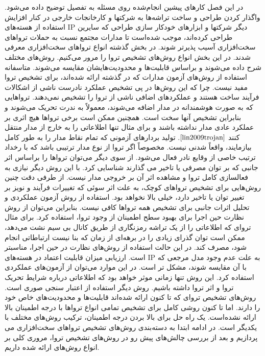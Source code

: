 

در این فصل کارهای پیشین انجام‌شده روی مسئله به تفصیل توضیح داده می‌شود.
واگذار کردن طراحی و ساخت تراشه‌ها به شرکتها و کارخانجات خارجی در کنار افزایش استفاده از هسته‌های IP دیگر شرکتها و ابزارهای خودکار سازی طراحی که سایرین طراحی کرده‌اند، موجب شده‌است تا مدارات مجتمع نسبت به حملات تروا‌های سخت‌افزاری آسیب پذیرتر شوند. در بخش گذشته انواع تروا‌های سخت‌افزاری معرفی شدند. در این بخش انواع روش‌های تشخیص تروا را مرور می‌کنیم. روش‌های مختلف شرح داده می‌شوند و براساس قابلیت‌ها و محدودیت‌هایشان مقایسه می‌شوند. متاسفانه استفاده از روش‌های آزمون مدارات که در گذشته ارائه شده‌اند، برای تشخیص تروا مفید نیست. چرا که این روش‌ها در پی تشخیص عملکرد نادرست ناشی از اشکالات فرآیند ساخت هستند و عملکردهای اضافی ناشی از تروا را تشخیص نمی‌دهند. تروا‌هایی که به صورت هوشمندانه در مدار اضافه می‌شوند، معمولاً به ندرت تحریک می‌شوند و بنابراین تشخیص آنها سخت است. همچنین ممکن است برخی تروا‌ها هیچ اثری بر عملکرد عادی مدار نداشته باشند و برای مثال تنها اطلاعاتی را به خارج از مدار منتقل کنند
 $\cite{lin2009trojan}$. 
تولید بردارهای آزمونی که تمام نقاط مدار را به طور کامل بیازمایند، واقعاً شدنی نیست. مخصوصاً اگر تروا از نوع مدار ترتیبی باشد که با رخداد ترتیب خاصی از وقایع نادر فعال می‌شود. از سوی دیگر می‌توان تروا‌ها را براساس اثر جانبی که بر توان مصرفی یا تاخیر می گذارند شناسایی کرد. با این روش دیگر نیازی به فعالسازی کامل تروا و مشاهده اثر آن بر خروجی مدار نیست. از طرفی دقت چنین روش‌هایی برای تشخیص تروا‌های کوچک، به علت اثر سوئی که تغییرات فرآیند و نویز  بر تغییر توان یا تاخیر دارد، خیلی بالا نخواهد بود. 
استفاده از روش آزمون عملکردی و تحلیل اثرات جانبی برای تشخیص همه تروا‌ها کافی نیست. بنابراین می‌توان از روش نظارت حین اجرا برای بهبود سطح اطمینان از وجود تروا، استفاده کرد. برای مثال تروای که اطلاعاتی را از یک تراشه رمزنگاری از طریق کانال بی سیم نشت می‌دهد، ممکن است توان گذرای زیادی را در برهه‌ای از زمان که بنا نیست ارتباطاتی انجام شود، مصرف کند. در این حالت استفاده از روش‌های نظارت در حین اجرا، مناسبتر است.
ارزیابی میزان قابلیت اعتماد در هسته‌های IP به علت عدم وجود مدل مرجعی که با آن مقایسه شوند، مشکل تر است. در این موارد می‌توان از آزمون‌های عملکردی استفاده کرد. این روش تنها زمانی موثر خواهد بود که اطلاعاتی درباره شرایط تحریک تروا و اثر تروا داشته باشیم.  روش دیگر استفاده از اعتبار سنجی صوری  است. 
روش‌های تشخیص تروای که تا کنون ارائه شده‌اند قابلیت‌ها و محدودیت‌های خاص خود را دارند. اما تا کنون روشی کامل برای تشخیص تمامی انواع تروا‌ها با درجه اطمینان بالا ارائه نشده‌است. یک راه حل برای بالا بردن درجه اطمینان، ترکیب روش‌های مختلف با یکدیگر است. در ادامه ابتدا به دسته‌بندی روش‌های تشخیص تروا‌های سخت‌افزاری می پردازیم و بعد از بررسی چالش‌های پیش رو در روش‌های تشخیص تروا، مروری کلی بر انواع روش‌های ارائه شده داریم.




